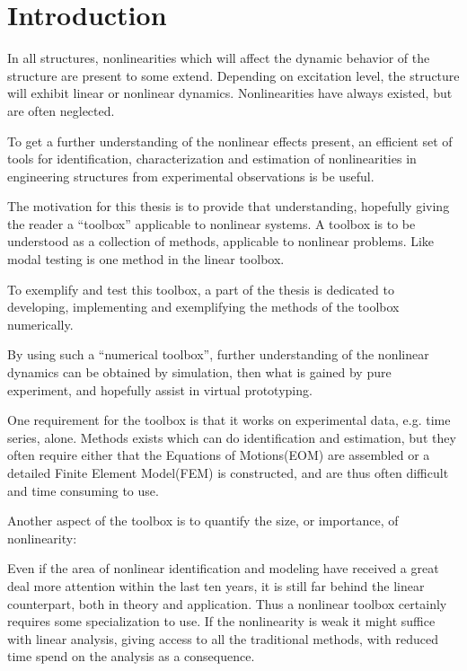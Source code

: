 \chapter{Introduction}
\label{sec:introduction}

In all structures, nonlinearities which will affect the dynamic behavior of the
structure are present to some extend. Depending on excitation level, the
structure will exhibit linear or nonlinear dynamics. Nonlinearities have always
existed, but are often neglected.

To get a further understanding of the nonlinear effects present, an efficient
set of tools for identification, characterization and estimation of
nonlinearities in engineering structures from experimental observations is be
useful.

The motivation for this thesis is to provide that understanding, hopefully
giving the reader a ``toolbox'' applicable to nonlinear systems. A toolbox is to
be understood as a collection of methods, applicable to nonlinear problems.
Like modal testing is one method in the linear toolbox.


To exemplify and test this toolbox, a part of the thesis is dedicated to
developing, implementing and exemplifying the methods of the toolbox
numerically.

By using such a ``numerical toolbox'', further understanding of the nonlinear
dynamics can be obtained by simulation, then what is gained by pure experiment,
and hopefully assist in virtual prototyping.

One requirement for the toolbox is that it works on experimental data, e.g. time
series, alone. Methods exists which can do identification and estimation, but
they often require either that the Equations of Motions(EOM) are assembled or a
detailed Finite Element Model(FEM) is constructed, and are thus often difficult
and time consuming to use.

Another aspect of the toolbox is to quantify the size, or importance, of
nonlinearity:

Even if the area of nonlinear identification and modeling have received a great
deal more attention within the last ten years, it is still far behind the linear
counterpart, both in theory and application. Thus a nonlinear toolbox certainly
requires some specialization to use.
If the nonlinearity is weak it might suffice with linear analysis, giving access
to all the traditional methods, with reduced time spend on the analysis as a
consequence.


